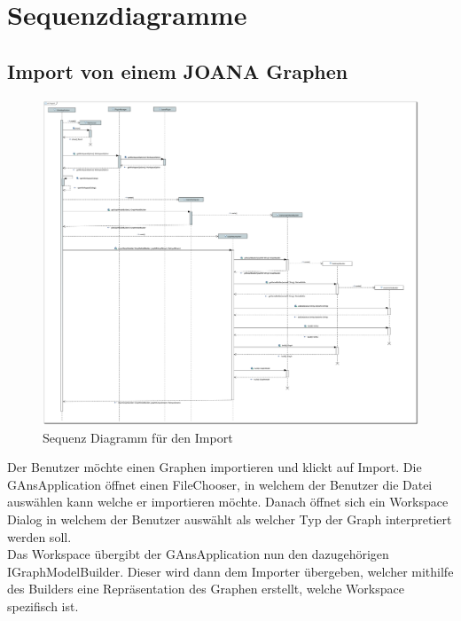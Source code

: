 \chapter{Sequenzdiagramme}

\section{Import von einem JOANA Graphen}

\begin{figure}[hb]
  \centering
  \includegraphics[width=450pt]{resourcen/SeqDiagramImport.PDF}
  \caption{Sequenz Diagramm für den Import}
  \label{seq:import}
\end{figure}

Der Benutzer möchte einen Graphen importieren und klickt auf Import. Die GAnsApplication öffnet einen FileChooser, in welchem der Benutzer die Datei auswählen kann welche er importieren möchte. Danach öffnet sich ein Workspace Dialog in welchem der Benutzer auswählt als welcher Typ der Graph interpretiert werden soll.\\
Das Workspace übergibt der GAnsApplication nun den dazugehörigen IGraphModelBuilder. Dieser wird dann dem Importer übergeben, welcher mithilfe des Builders eine Repräsentation des Graphen erstellt, welche Workspace spezifisch ist.

